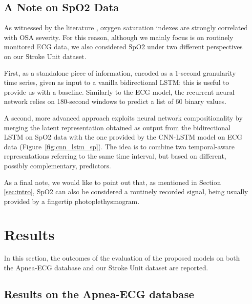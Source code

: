 \documentclass[5p,twocolumn,lefttitle]{elsarticle}
\begin{document}
\subsection{A Note on SpO2 Data}

As witnessed by the literature \cite{wali2020correlation}, oxygen saturation indexes are strongly correlated with OSA severity. 
For this reason, although we mainly focus is on routinely monitored ECG data, we also considered SpO2 under two different perspectives on our Stroke Unit dataset. 

First, as a standalone piece of information, encoded as a 1-second granularity time series, given as input to a vanilla bidirectional LSTM; this is useful to provide us with a baseline. Similarly to the ECG model, the recurrent neural network relies on 180-second windows to predict a list of 60 binary values. 

A second, more advanced approach exploits neural network compositionality by merging the latent representation obtained as output from the bidirectional LSTM on SpO2 data with the one provided by the CNN-LSTM model on ECG data (Figure~\ref{fig:cnn_lstm_sp}). The idea is to combine two temporal-aware representations referring to the same time interval, but based on different, possibly complementary, predictors.

As a final note, we would like to point out that, as mentioned in Section \ref{sec:intro},  SpO2 can also be considered a routinely recorded signal, being usually provided by a fingertip photoplethysmogram.






\section{Results}
\label{sec:res}

In this section, the outcomes of the evaluation of the proposed models on both the Apnea-ECG database and our Stroke Unit dataset are reported.

\subsection{Results on the Apnea-ECG database}
\end{document}
